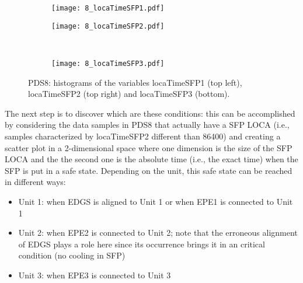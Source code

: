 \begin{figure}
  \begin{subfigure}{.5\linewidth}
    \centering
    \texttt{[image: 8\_locaTimeSFP1.pdf]}
  \end{subfigure}%
  \begin{subfigure}{.5\linewidth}
    \centering
    \texttt{[image: 8\_locaTimeSFP2.pdf]}
  \end{subfigure}\\[1ex]
  \begin{subfigure}{\linewidth}
    \centering
    \texttt{[image: 8\_locaTimeSFP3.pdf]}
  \end{subfigure}
  \caption{PDS8: histograms of the variables locaTimeSFP1 (top left), locaTimeSFP2 (top right) and locaTimeSFP3 (bottom).}
  \label{fig:histPDS8_8_locaTimeSFP}
\end{figure}

The next step is to discover which are these conditions: this can be accomplished by considering the data samples
in PDS8 that actually have a SFP LOCA (i.e., samples characterized by locaTimeSFP2 different than 86400) 
and creating a scatter plot
in a 2-dimensional space where one dimension is the size of the SFP LOCA and the the second one is
the absolute time (i.e., the exact time) when the SFP is put in a safe state. 
Depending on the unit, this safe state can be reached in different ways:
\begin{itemize}
  \item Unit 1: when EDGS is aligned to Unit 1 or when EPE1 is connected to Unit 1
  \item Unit 2: when EPE2 is connected to Unit 2; note that the erroneous alignment of EDGS plays a role here since
                its occurrence brings it in an critical condition (no cooling in SFP)
  \item Unit 3: when EPE3 is connected to Unit 3
\end{itemize}

